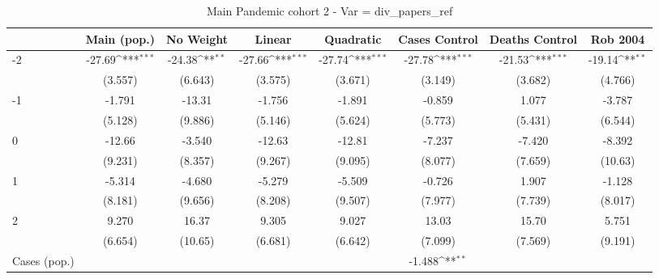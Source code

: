 \documentclass{article}
\begin{document}
{
\def\sym#1{\ifmmode^{#1}\else\(^{#1}\)\fi}
\begin{longtable}{l*{7}{c}}
\caption{Main Pandemic cohort 2 - Var = div\_papers\_ref}\\
\hline\hline\endfirsthead\hline\endhead\hline\endfoot\endlastfoot
                &\multicolumn{1}{c}{Main (pop.)}&\multicolumn{1}{c}{No Weight}&\multicolumn{1}{c}{Linear}&\multicolumn{1}{c}{Quadratic}&\multicolumn{1}{c}{Cases Control}&\multicolumn{1}{c}{Deaths Control}&\multicolumn{1}{c}{Rob 2004}\\
\hline
-2              &   -27.69\sym{***}&   -24.38\sym{**} &   -27.66\sym{***}&   -27.74\sym{***}&   -27.78\sym{***}&   -21.53\sym{***}&   -19.14\sym{**} \\
                &  (3.557)         &  (6.643)         &  (3.575)         &  (3.671)         &  (3.149)         &  (3.682)         &  (4.766)         \\
-1              &   -1.791         &   -13.31         &   -1.756         &   -1.891         &   -0.859         &    1.077         &   -3.787         \\
                &  (5.128)         &  (9.886)         &  (5.146)         &  (5.624)         &  (5.773)         &  (5.431)         &  (6.544)         \\
0               &   -12.66         &   -3.540         &   -12.63         &   -12.81         &   -7.237         &   -7.420         &   -8.392         \\
                &  (9.231)         &  (8.357)         &  (9.267)         &  (9.095)         &  (8.077)         &  (7.659)         &  (10.63)         \\
1               &   -5.314         &   -4.680         &   -5.279         &   -5.509         &   -0.726         &    1.907         &   -1.128         \\
                &  (8.181)         &  (9.656)         &  (8.208)         &  (9.507)         &  (7.977)         &  (7.739)         &  (8.017)         \\
2               &    9.270         &    16.37         &    9.305         &    9.027         &    13.03         &    15.70         &    5.751         \\
                &  (6.654)         &  (10.65)         &  (6.681)         &  (6.642)         &  (7.099)         &  (7.569)         &  (9.191)         \\
Cases (pop.)    &                  &                  &                  &                  &   -1.488\sym{**} &                  &                  \\

\end{longtable}}
\end{document}
